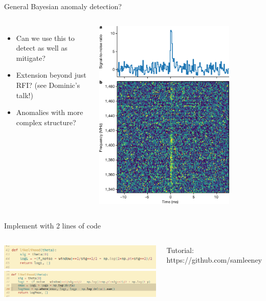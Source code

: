 \documentclass{beamer}
\begin{document}
\begin{frame}{General Bayesian anomaly detection?}
  
\begin{columns}
\centering
    \begin{itemize}
    \item Can we use this to detect as well as mitigate?
    \item Extension beyond just RFI? (see Dominic's talk!)
    \item Anomalies with more complex structure?
\end{itemize}
\includegraphics[width=0.8\textwidth]{frb.png}
\end{columns}
\end{frame}


\begin{frame}{Implement with 2 lines of code}
\begin{columns}
  
\includegraphics[width=1\textwidth]{logl1.png}
\includegraphics[width=1\textwidth]{logl2.png}


Tutorial: https://github.com/samleeney
\end{columns}
\end{frame}
\end{document}
